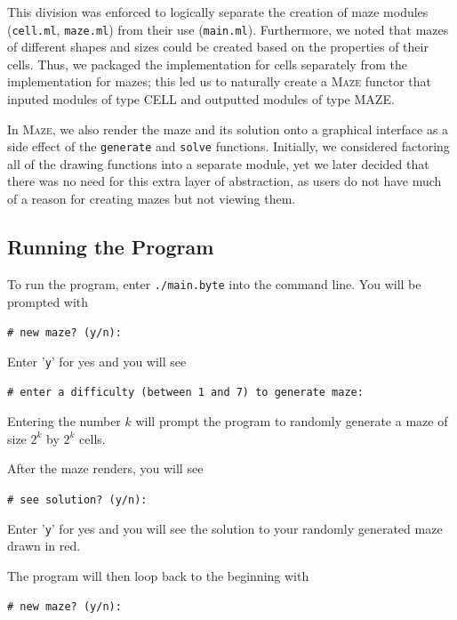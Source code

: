 \documentclass[11pt, margin=1in]{article}
\newcommand{\tab}{\par \qquad}
\begin{document}
This division was enforced to logically separate the creation of maze modules (\texttt{cell.ml}, \texttt{maze.ml}) from their use (\texttt{main.ml}).  Furthermore, we noted that mazes of different shapes and sizes could be created based on the properties of their cells.  Thus, we packaged the implementation for cells separately from the implementation for mazes; this led us to naturally create a \textsc{Maze} functor that inputed modules of type \textsc{CELL} and outputted modules of type \textsc{MAZE}.
\tab In \textsc{Maze}, we also render the maze and its solution onto a graphical interface as a side effect of the \texttt{generate} and \texttt{solve} functions.  Initially, we considered factoring all of the drawing functions into a separate module, yet we later decided that there was no need for this extra layer of abstraction, as users do not have much of a reason for creating mazes but not viewing them.     

\subsection{Running the Program} %
To run the program, enter \texttt{./main.byte} into the command line.  You will be prompted with

\begin{flushleft}
\quad \quad \texttt{\# new maze? (y/n): } 
\end{flushleft}

Enter '\texttt{y}' for yes and you will see

\begin{flushleft}
\quad \quad \texttt{\# enter a difficulty (between 1 and 7) to generate maze:}
\end{flushleft}


Entering the number $k$ will prompt the program to randomly generate a maze of size $2^k$ by $2^k$ cells.  

After the maze renders, you will see 

\begin{flushleft}
\quad \quad \texttt{\# see solution? (y/n):}
\end{flushleft}

Enter '\texttt{y}' for yes and you will see the solution to your randomly generated maze drawn in red.

 The program will then loop back to the beginning with 

\begin{flushleft}
\quad \quad \texttt{\# new maze? (y/n): } 
\end{flushleft}
\end{document}
